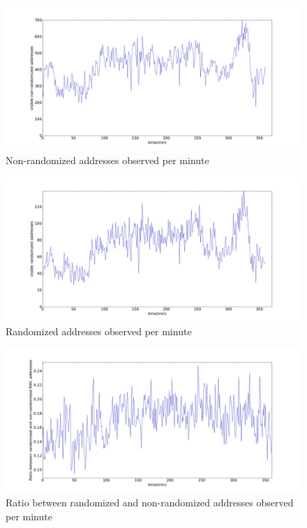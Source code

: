 \documentclass[10pt,a4paper]{article}
\begin{document}
\begin{figure}[h!]
	\centering
	\includegraphics[width=130mm]{nonrandomized.jpeg}
	\caption{Non-randomized addresses observed per minute}
	\label{fig:nonrandomizedadresses}
\end{figure} 
\begin{figure}[h!]
	\centering
	\includegraphics[width=130mm]{randomized.jpeg}
	\caption{Randomized addresses observed per minute}
	\label{fig:randomizedaddresses}
\end{figure} 
\begin{figure}[h!]
	\centering
	\includegraphics[width=130mm]{RatioRandNonrand.jpeg}
	\caption{Ratio between randomized and non-randomized addresses observed per minute}
	\label{fig:randomized}
\end{figure} 
\end{document}
